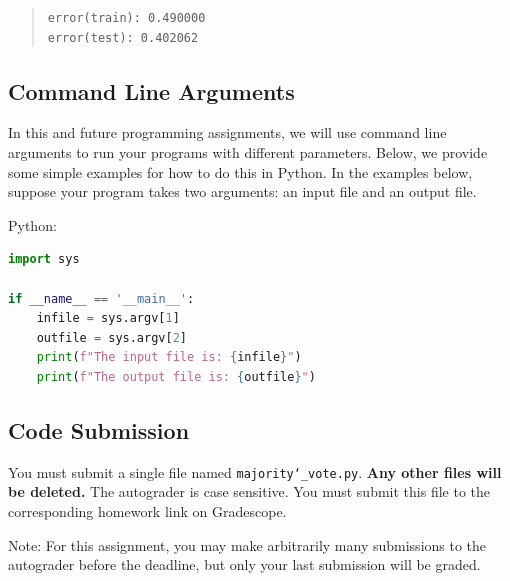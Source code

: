\documentclass[11pt,addpoints,answers]{exam}
\begin{document}
\begin{quote}
\begin{verbatim}
error(train): 0.490000
error(test): 0.402062
\end{verbatim}
\end{quote}

\subsection{Command Line Arguments}

In this and future programming assignments, we will use command line arguments to run your programs with different parameters. Below, we provide some simple examples for how to do this in Python. In the examples below, suppose your program takes two arguments: an input file and an output file.

Python:
\begin{lstlisting}[language=Python]
import sys

if __name__ == '__main__':
    infile = sys.argv[1]
    outfile = sys.argv[2]
    print(f"The input file is: {infile}")
    print(f"The output file is: {outfile}")
\end{lstlisting}

\subsection{Code Submission}

You must submit a single file named \texttt{majority\char`_vote.py}. \textbf{Any other files will be deleted.} The autograder is case sensitive. You must submit this file to the corresponding homework link on Gradescope.

Note: For this assignment, you may make arbitrarily many submissions to the autograder before the deadline, but only your last submission will be graded.




\clearpage\clearpage
\end{document}
